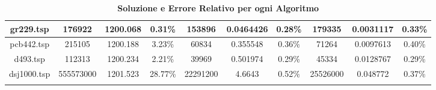 \begin{longtable}{|c|c|c|c|c|c|c|c|c|c|}
gr229.tsp        & 176922             & 1200.068           & 0.31\%          & 153896             & 0.0464426          & 0.28\%          & 179335             & 0.0031117          & 0.33\%          \\ \hline
pcb442.tsp       & 215105             & 1200.188           & 3.23\%          & 60834              & 0.355548           & 0.36\%          & 71264              & 0.0097613          & 0.40\%          \\ \hline
d493.tsp         & 112313             & 1200.234           & 2.21\%          & 39969              & 0.501974           & 0.29\%          & 45334              & 0.0128767          & 0.29\%          \\ \hline
dsj1000.tsp      & 555573000          & 1201.523           & 28.77\%         & 22291200           & 4.6643             & 0.52\%          & 25526000           & 0.048772           & 0.37\%          \\ \hline
\caption{\textbf{Soluzione e Errore Relativo per ogni Algoritmo}}
\end{longtable}